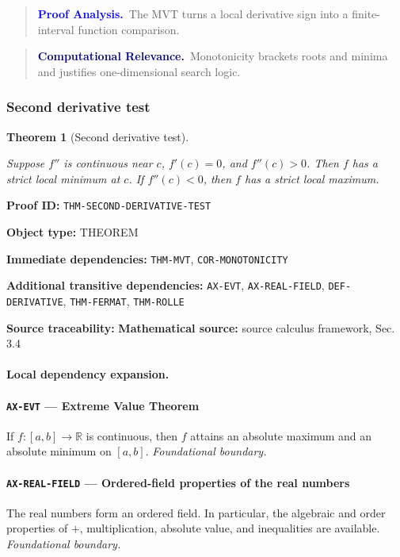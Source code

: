 \documentclass[10pt]{article}
\newcommand{\pidraw}[1]{\begingroup\urlstyle{tt}\nolinkurl{#1}\endgroup}
\newtheorem{theorem}{Theorem}[section]
\theoremstyle{definition}
\theoremstyle{remark}
\newenvironment{proofanalysis}
{\begin{quote}\small\noindent\textbf{\textcolor{blue}{Proof Analysis.}}\ }
{\end{quote}}
\newenvironment{computationalrelevance}
{\begin{quote}\small\noindent\textbf{\textcolor{navy}{Computational Relevance.}}\ }
{\end{quote}}
\newcommand{\meta}[2]{\noindent\textbf{#1:} #2\par}
\begin{document}
\begin{proofanalysis}The MVT turns a local derivative sign into a finite-interval function comparison.\end{proofanalysis}

\begin{computationalrelevance}Monotonicity brackets roots and minima and justifies one-dimensional search logic.\end{computationalrelevance}

\subsubsection{Second derivative test}

\begin{theorem}[Second derivative test]\label{prf:THM-SECOND-DERIVATIVE-TEST}

Suppose $f''$ is continuous near $c$, $f'(c)=0$, and $f''(c)>0$. Then $f$ has a strict local minimum at $c$. If $f''(c)<0$, then $f$ has a strict local maximum.

\end{theorem}

\meta{Proof ID}{\pidraw{THM-SECOND-DERIVATIVE-TEST}}
\meta{Object type}{THEOREM}
\meta{Immediate dependencies}{\pidraw{THM-MVT}, \pidraw{COR-MONOTONICITY}}
\meta{Additional transitive dependencies}{\pidraw{AX-EVT}, \pidraw{AX-REAL-FIELD}, \pidraw{DEF-DERIVATIVE}, \pidraw{THM-FERMAT}, \pidraw{THM-ROLLE}}
\meta{Source traceability}{\textbf{Mathematical source:} source calculus framework, Sec. 3.4}

\paragraph{Local dependency expansion.}

\paragraph{\pidraw{AX-EVT} --- Extreme Value Theorem}
If $f:[a,b]\to\mathbb{R}$ is continuous, then $f$ attains an absolute maximum and an absolute minimum on $[a,b]$.
\textit{Foundational boundary.}

\paragraph{\pidraw{AX-REAL-FIELD} --- Ordered-field properties of the real numbers}
The real numbers form an ordered field. In particular, the algebraic and order properties of $+$, multiplication, absolute value, and inequalities are available.
\textit{Foundational boundary.}
\end{document}
